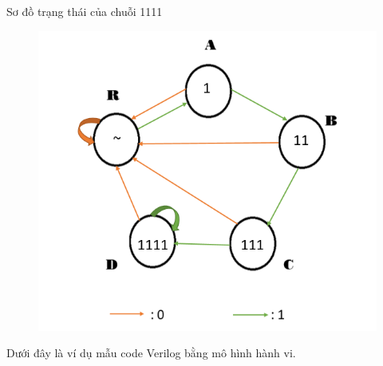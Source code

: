 \documentclass[a4paper]{article}
\begin{document}
	
	Sơ đồ trạng thái của chuỗi 1111
	\begin{center}
	\begin{figure}[h]
		\begin{center}
			\includegraphics[scale=0.53]{1111.png}
		\end{center}
	\end{figure}
	\end{center}
		
	Dưới đây là ví dụ mẫu code Verilog bằng mô hình hành vi.\cite{bib2}
	
\end{document}
